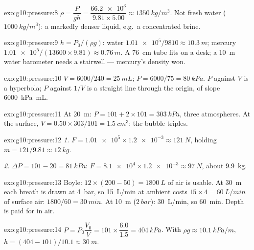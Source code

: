 \begin{solution}{exo:g10:pressure:8}
$\rho = \dfrac{P}{g h} = \dfrac{\num{66.2e3}}{9.81 \times 5.00}
\approx \qty{1350}{kg/m^3}$. Not fresh water ($\qty{1000}{kg/m^3}$):
a markedly denser liquid, e.g.\ a concentrated brine.
\end{solution}

\begin{solution}{exo:g10:pressure:9}
$h = P_0/(\rho g)$: water
$\num{1.01e5}/9810 \approx \qty{10.3}{m}$; mercury
$\num{1.01e5}/(13600 \times 9.81) \approx \qty{0.76}{m}$. A
\qty{76}{cm} tube fits on a desk; a \qty{10}{m} water barometer needs
a stairwell --- mercury's density won.
\end{solution}

\begin{solution}{exo:g10:pressure:10}
$V = 6000/240 = \qty{25}{mL}$; $P = 6000/75 = \qty{80}{kPa}$.
$P$ against $V$ is a hyperbola; $P$ against $1/V$ is a straight line
through the origin, of slope \qty{6000}{kPa.mL}.
\end{solution}

\begin{solution}{exo:g10:pressure:11}
At \qty{20}{m}: $P = 101 + 2 \times 101 = \qty{303}{kPa}$, three
atmospheres. At the surface,
$V = 0.50 \times 303/101 = \qty{1.5}{cm^3}$: the bubble triples.
\end{solution}

\begin{solution}{exo:g10:pressure:12}
\emph{1.} $F = \num{1.01e5} \times \num{1.2e-3} \approx \qty{121}{N}$,
holding $m = 121/9.81 \approx \qty{12}{kg}$.

\emph{2.} $\Delta P = 101 - 20 = \qty{81}{kPa}$:
$F = \num{8.1e4} \times \num{1.2e-3} \approx \qty{97}{N}$, about
\qty{9.9}{kg}.
\end{solution}

\begin{solution}{exo:g10:pressure:13}
Boyle: $12 \times (200 - 50) = \qty{1800}{L}$ of  air
is usable. At \qty{30}{m} each breath is drawn at \qty{4}{bar}, so
\qty{15}{L/min} at ambient  costs
$15 \times 4 = \qty{60}{L/min}$ of surface air: $1800/60 =
\qty{30}{min}$. At \qty{10}{m} ($\qty{2}{bar}$): \qty{30}{L/min},
so \qty{60}{min}. Depth is paid for in air.
\end{solution}

\begin{solution}{exo:g10:pressure:14}
$P = P_0 \dfrac{V_0}{V} = 101 \times \dfrac{6.0}{1.5} =
\qty{404}{kPa}$. With $\rho g \approx \qty{10.1}{kPa/m}$,
$h = (404 - 101)/10.1 \approx \qty{30}{m}$.
\end{solution}

